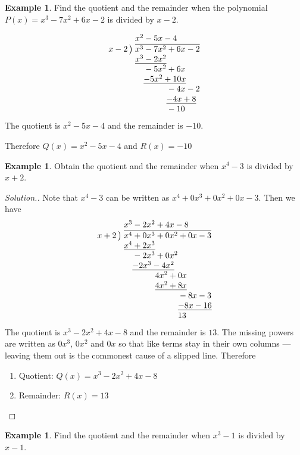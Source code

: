 \documentclass[11pt,a4paper]{article}
\theoremstyle{definition}
\newtheorem{example}[thm]{Example}
\newenvironment{solution}
  {\renewcommand{\qedsymbol}{}\begin{proof}[\textit{Solution}.]}
  {\end{proof}}
\begin{document}
\begin{example}

Find the quotient and the remainder when the polynomial $P(x)=x^3-7x^2+6x-2$ is divided by $x-2$.

$$\begin{array}{r@{\;}l}
 & x^{2}-5x-4\\
x-2\,\big) & \overline{x^{3}-7x^{2}+6x-2}\\
 & \underline{x^{3}-2x^{2}}\phantom{{}+6x-2}\\
 & \phantom{x^{3}}-5x^{2}+6x\phantom{{}-2}\\
 & \phantom{x^{3}}\underline{-5x^{2}+10x}\phantom{{}-2}\\
 & \phantom{x^{3}-5x^{2}}-4x-2\\
 & \phantom{x^{3}-5x^{2}}\underline{-4x+8}\\
 & \phantom{x^{3}-5x^{2}}-10
\end{array}$$
The quotient is $x^{2}-5x-4$ and the remainder is $-10$.

Therefore $Q(x)=x^2-5x-4$ and $R(x)=-10$
\end{example}
\begin{example}

Obtain the quotient and the remainder when $x^4-3$ is divided by $x+2$.
\end{example}
\begin{solution}

Note that $x^4-3$ can be written as $x^4+0x^3+0x^2+0x-3$.
Then we have
$$\begin{array}{r@{\;}l}
 & x^{3}-2x^{2}+4x-8\\
x+2\,\big) & \overline{x^{4}+0x^{3}+0x^{2}+0x-3}\\
 & \underline{x^{4}+2x^{3}}\phantom{{}+0x^{2}+0x-3}\\
 & \phantom{x^{4}}-2x^{3}+0x^{2}\phantom{{}+0x-3}\\
 & \phantom{x^{4}}\underline{-2x^{3}-4x^{2}}\phantom{{}+0x-3}\\
 & \phantom{x^{4}-2x^{3}}4x^{2}+0x\phantom{{}-3}\\
 & \phantom{x^{4}-2x^{3}}\underline{4x^{2}+8x}\phantom{{}-3}\\
 & \phantom{x^{4}-2x^{3}+4x^{2}}-8x-3\\
 & \phantom{x^{4}-2x^{3}+4x^{2}}\underline{-8x-16}\\
 & \phantom{x^{4}-2x^{3}+4x^{2}}13
\end{array}$$
The quotient is $x^{3}-2x^{2}+4x-8$ and the remainder is $13$. The missing
powers are written as $0x^{3}$, $0x^{2}$ and $0x$ so that like terms stay in
their own columns --- leaving them out is the commonest cause of a slipped
line.
Therefore
\begin{enumerate}
\item[] Quotient: $Q(x)=x^3-2x^2+4x-8$
\item[] Remainder: $R(x)=13$\\
\end{enumerate}
\end{solution}
\begin{example}
Find the quotient and the remainder when $x^{3}-1$ is divided by $x-1$.
\end{example}
\end{document}
